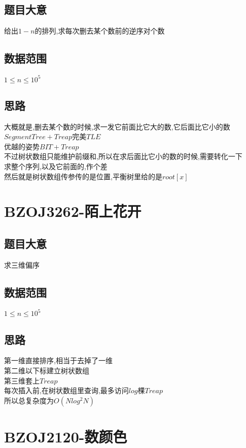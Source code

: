 \documentclass{ctexart}
\numberwithin{equation}{section}
\begin{document}
\begin{flushleft}
  \subsection{题目大意}
  给出$1-n$的排列,求每次删去某个数前的逆序对个数\\
  \subsection{数据范围}
  $1\le n\le 10^5$\\
  \subsection{思路}
  大概就是,删去某个数的时候,求一发它前面比它大的数,它后面比它小的数\\
  $Segment Tree+Treap$完美$TLE$\\
  优越的姿势$BIT+Treap$\\
  不过树状数组只能维护前缀和,所以在求后面比它小的数的时候,需要转化一下\\
  求整个序列,以及它前面的,作个差\\
  然后就是树状数组传参传的是位置,平衡树里给的是$root[x]$\\
  \newpage

  \section{BZOJ3262-陌上花开}
  \subsection{题目大意}
  求三维偏序\\
  \subsection{数据范围}
  $1\le n\le 10^5$\\
  \subsection{思路}
  第一维直接排序,相当于去掉了一维\\
  第二维以下标建立树状数组\\
  第三维套上$Treap$\\
  每次插入前,在树状数组里查询,最多访问$log$棵$Treap$\\
  所以总复杂度为$O(Nlog^2N)$\\
  \newpage

  \section{BZOJ2120-数颜色}

\end{flushleft}
\end{document}
